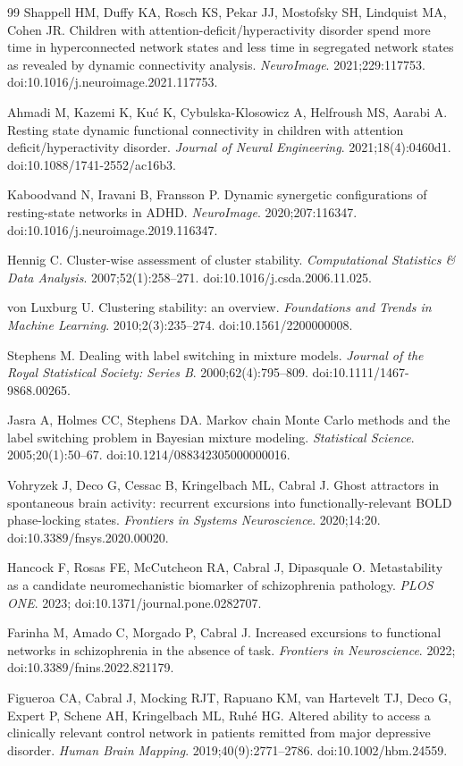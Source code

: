 \documentclass[11pt]{ctexart}
\theoremstyle{definition}
\begin{document}
\begin{thebibliography}{99}
Shappell HM, Duffy KA, Rosch KS, Pekar JJ, Mostofsky SH, Lindquist MA, Cohen JR.
Children with attention-deficit/hyperactivity disorder spend more time in hyperconnected
network states and less time in segregated network states as revealed by dynamic
connectivity analysis.
\textit{NeuroImage}. 2021;229:117753. doi:10.1016/j.neuroimage.2021.117753.

Ahmadi M, Kazemi K, Ku\'c K, Cybulska-Klosowicz A, Helfroush MS, Aarabi A.
Resting state dynamic functional connectivity in children with attention
deficit/hyperactivity disorder.
\textit{Journal of Neural Engineering}. 2021;18(4):0460d1.
doi:10.1088/1741-2552/ac16b3.

Kaboodvand N, Iravani B, Fransson P.
Dynamic synergetic configurations of resting-state networks in ADHD.
\textit{NeuroImage}. 2020;207:116347. doi:10.1016/j.neuroimage.2019.116347.

Hennig C.
Cluster-wise assessment of cluster stability.
\textit{Computational Statistics \& Data Analysis}. 2007;52(1):258--271.
doi:10.1016/j.csda.2006.11.025.

von Luxburg U.
Clustering stability: an overview.
\textit{Foundations and Trends in Machine Learning}. 2010;2(3):235--274.
doi:10.1561/2200000008.

Stephens M.
Dealing with label switching in mixture models.
\textit{Journal of the Royal Statistical Society: Series B}. 2000;62(4):795--809.
doi:10.1111/1467-9868.00265.

Jasra A, Holmes CC, Stephens DA.
Markov chain Monte Carlo methods and the label switching problem in Bayesian mixture
modeling.
\textit{Statistical Science}. 2005;20(1):50--67. doi:10.1214/088342305000000016.

Vohryzek J, Deco G, Cessac B, Kringelbach ML, Cabral J.
Ghost attractors in spontaneous brain activity: recurrent excursions into functionally-relevant
BOLD phase-locking states.
\textit{Frontiers in Systems Neuroscience}. 2020;14:20. doi:10.3389/fnsys.2020.00020.

Hancock F, Rosas FE, McCutcheon RA, Cabral J, Dipasquale O.
Metastability as a candidate neuromechanistic biomarker of schizophrenia pathology.
\textit{PLOS ONE}. 2023; doi:10.1371/journal.pone.0282707.

Farinha M, Amado C, Morgado P, Cabral J.
Increased excursions to functional networks in schizophrenia in the absence of task.
\textit{Frontiers in Neuroscience}. 2022; doi:10.3389/fnins.2022.821179.

Figueroa CA, Cabral J, Mocking RJT, Rapuano KM, van Hartevelt TJ, Deco G, Expert P,
Schene AH, Kringelbach ML, Ruh\'e HG.
Altered ability to access a clinically relevant control network in patients remitted from
major depressive disorder.
\textit{Human Brain Mapping}. 2019;40(9):2771--2786. doi:10.1002/hbm.24559.

\end{thebibliography}
\end{document}
